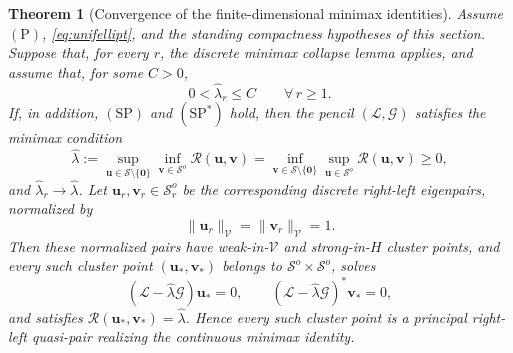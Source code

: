 \documentclass[10pt,a4paper]{amsart}
\newtheorem{theorem}{Theorem}
\begin{document}
\begin{theorem}[Convergence of the finite-dimensional minimax identities]
	\label{thm:continuous-minimax-limit}
	Assume \(\mathrm{(P)}\), \eqref{eq:unifellipt}, and the standing compactness
	hypotheses of this section. Suppose that, for every \(r\), the discrete
	minimax collapse lemma applies, and assume that, for some \(C>0\),
	\begin{equation}\label{eq:estM}
		0<\hat\lambda_r\le C
		\qquad
		\forall\,r\ge1.
	\end{equation}
	If, in addition, \(\mathrm{(SP)}\) and \(\mathrm{(SP^*)}\) hold, then the pencil
	\((\mathcal L,\mathcal G)\) satisfies the minimax condition
	\begin{equation}\label{eq:mimaPrin1}
		\hat\lambda
		:=
		\sup_{\mathbf u\in\mathcal S\setminus\{\mathbf0\}}
		\inf_{\mathbf v\in\mathcal S^o}\mathcal R(\mathbf u,\mathbf v)
		=
		\inf_{\mathbf v\in\mathcal S\setminus\{\mathbf0\}}
		\sup_{\mathbf u\in\mathcal S^o}\mathcal R(\mathbf u,\mathbf v)
		\ge
		0,
	\end{equation}
	and \(\hat\lambda_r\to\hat\lambda\). Let
	\(\mathbf u_r,\mathbf v_r\in\mathcal S_r^o\) be the corresponding discrete
	right-left eigenpairs, normalized by
	\[
	\|\mathbf u_r\|_{\mathcal V}
	=
	\|\mathbf v_r\|_{\mathcal V}
	=
	1.
	\]
	Then these normalized pairs have weak-in-\(\mathcal V\) and strong-in-\(H\)
	cluster points, and every such cluster point \((\mathbf u_*,\mathbf v_*)\)
	belongs to \(\mathcal S^o\times\mathcal S^o\), solves
	\[
	(\mathcal L-\hat\lambda\mathcal G)\mathbf u_*=0,
	\qquad
	(\mathcal L-\hat\lambda\mathcal G)^*\mathbf v_*=0,
	\]
	and satisfies \(\mathcal R(\mathbf u_*,\mathbf v_*)=\hat\lambda\). Hence
	every such cluster point is a principal right-left quasi-pair realizing
	the continuous minimax identity.
\end{theorem}
\end{document}
